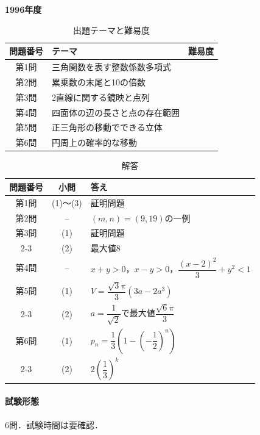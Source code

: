 \documentclass[../../main.tex]{subfiles}
\begin{document}
\begin{center}
  {\fontsize{48pt}{58pt}\selectfont \textbf{1996}\normalsize\textbf{年度}}
\end{center}

\begin{table}[htb]
  \centering
  \caption{出題テーマと難易度}
  \begin{tabular}{|c|p{9cm}|c|}
    \hline
    \textbf{問題番号} & \textbf{テーマ} & \textbf{難易度} \\
    \hline
    第1問 & 三角関数を表す整数係数多項式 & \\
    \hline
    第2問 & 累乗数の末尾と10の倍数 & \\
    \hline
    第3問 & 2直線に関する鏡映と点列 & \\
    \hline
    第4問 & 四面体の辺の長さと点の存在範囲 & \\
    \hline
    第5問 & 正三角形の移動でできる立体 & \\
    \hline
    第6問 & 円周上の確率的な移動 & \\
    \hline
  \end{tabular}
\end{table}

\begin{table}[htb]
  \centering
  \caption{解答}
  \renewcommand{\arraystretch}{1.4}
  \begin{tabular}{|c|c|p{9cm}|}
    \hline
    \textbf{問題番号} & \textbf{小問} & \textbf{答え} \\
    \hline
    第1問 & (1)〜(3) & 証明問題 \\
    \hline
    第2問 & -- & $(m,n)=(9,19)$の一例 \\
    \hline
    第3問 & (1) & 証明問題 \\
    \cline{2-3}
    & (2) & 最大値$8$ \\
    \hline
    第4問 & -- & $x+y>0$，$x-y>0$，$\dfrac{(x-2)^2}{3}+y^2<1$ \\
    \hline
    第5問 & (1) & $V=\dfrac{\sqrt{3}\pi}{3}(3a-2a^3)$ \\
    \cline{2-3}
    & (2) & $a=\dfrac{1}{\sqrt{2}}$で最大値$\dfrac{\sqrt{6}\pi}{3}$ \\
    \hline
    第6問 & (1) & $p_n=\dfrac{1}{3}\left(1-\left(-\dfrac{1}{2}\right)^n\right)$ \\
    \cline{2-3}
    & (2) & $2\left(\dfrac{1}{3}\right)^k$ \\
    \hline
  \end{tabular}
\end{table}

\paragraph{試験形態}
6問．試験時間は要確認．
\end{document}
